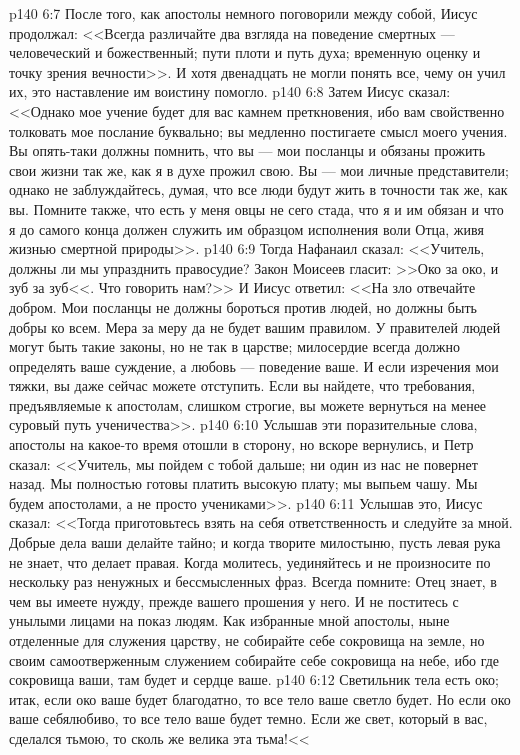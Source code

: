 \vs p140 6:7 После того, как апостолы немного поговорили между собой, Иисус продолжал: <<Всегда различайте два взгляда на поведение смертных --- человеческий и божественный; пути плоти и путь духа; временную оценку и точку зрения вечности>>. И хотя двенадцать не могли понять все, чему он учил их, это наставление им воистину помогло.
\vs p140 6:8 Затем Иисус сказал: <<Однако мое учение будет для вас камнем преткновения, ибо вам свойственно толковать мое послание буквально; вы медленно постигаете смысл моего учения. Вы опять\hyp{}таки должны помнить, что вы --- мои посланцы и обязаны прожить свои жизни так же, как я в духе прожил свою. Вы --- мои личные представители; однако не заблуждайтесь, думая, что все люди будут жить в точности так же, как вы. Помните также, что есть у меня овцы не сего стада, что я и им обязан и что я до самого конца должен служить им образцом исполнения воли Отца, живя жизнью смертной природы>>.
\vs p140 6:9 Тогда Нафанаил сказал: <<Учитель, должны ли мы упразднить правосудие? Закон Моисеев гласит: >>Око за око, и зуб за зуб<<. Что говорить нам?>> И Иисус ответил: <<На зло отвечайте добром. Мои посланцы не должны бороться против людей, но должны быть добры ко всем. Мера за меру да не будет вашим правилом. У правителей людей могут быть такие законы, но не так в царстве; милосердие всегда должно определять ваше суждение, а любовь --- поведение ваше. И если изречения мои тяжки, вы даже сейчас можете отступить. Если вы найдете, что требования, предъявляемые к апостолам, слишком строгие, вы можете вернуться на менее суровый путь ученичества>>.
\vs p140 6:10 Услышав эти поразительные слова, апостолы на какое\hyp{}то время отошли в сторону, но вскоре вернулись, и Петр сказал: <<Учитель, мы пойдем с тобой дальше; ни один из нас не повернет назад. Мы полностью готовы платить высокую плату; мы выпьем чашу. Мы будем апостолами, а не просто учениками>>.
\vs p140 6:11 Услышав это, Иисус сказал: <<Тогда приготовьтесь взять на себя ответственность и следуйте за мной. Добрые дела ваши делайте тайно; и когда творите милостыню, пусть левая рука не знает, что делает правая. Когда молитесь, уединяйтесь и не произносите по нескольку раз ненужных и бессмысленных фраз. Всегда помните: Отец знает, в чем вы имеете нужду, прежде вашего прошения у него. И не поститесь с унылыми лицами на показ людям. Как избранные мной апостолы, ныне отделенные для служения царству, не собирайте себе сокровища на земле, но своим самоотверженным служением собирайте себе сокровища на небе, ибо где сокровища ваши, там будет и сердце ваше.
\vs p140 6:12 Светильник тела есть око; итак, если око ваше будет благодатно, то все тело ваше светло будет. Но если око ваше себялюбиво, то все тело ваше будет темно. Если же свет, который в вас, сделался тьмою, то сколь же велика эта тьма!<<
